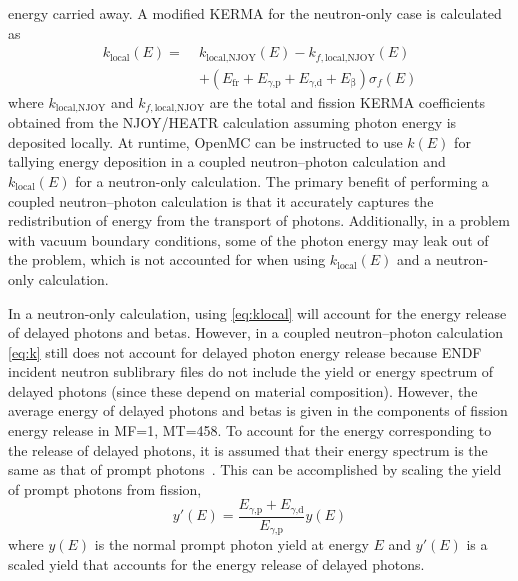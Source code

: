 \documentclass{anstrans}
\newcommand{\efr}{E_\text{fr}}
\newcommand{\egp}{E_\text{$\gamma$,p}}
\newcommand{\egd}{E_\text{$\gamma$,d}}
\newcommand{\eb}{E_\upbeta}
\begin{document}
energy carried away. A modified KERMA for the neutron-only case is calculated as
\begin{equation}
    \label{eq:klocal}
    \begin{split}
    k_\text{local}(E) = \; &k_\text{local,NJOY}(E) - k_{f,\text{local,NJOY}}(E) \\
        &+ \left ( \efr + \egp + \egd + \eb \right )  \sigma_f(E)
    \end{split}
\end{equation}
where $k_\text{local,NJOY}$ and $k_{f,\text{local,NJOY}}$ are the total and
fission KERMA coefficients obtained from the NJOY/HEATR calculation assuming
photon energy is deposited locally. At runtime, OpenMC can be instructed to use
$k(E)$ for tallying energy deposition in a coupled neutron--photon calculation
and $k_\text{local}(E)$ for a neutron-only calculation. The primary benefit of
performing a coupled neutron--photon calculation is that it accurately captures
the redistribution of energy from the transport of photons. Additionally, in a
problem with vacuum boundary conditions, some of the photon energy may leak out
of the problem, which is not accounted for when using $k_\text{local}(E)$ and a
neutron-only calculation.

In a neutron-only calculation, using \cref{eq:klocal} will account for the
energy release of delayed photons and betas. However, in a coupled
neutron--photon calculation \cref{eq:k} still does not account for delayed
photon energy release because ENDF incident neutron sublibrary files do not
include the yield or energy spectrum of delayed photons (since these depend on
material composition). However, the average energy of delayed photons and betas
is given in the components of fission energy release in MF=1, MT=458. To account
for the energy corresponding to the release of delayed photons, it is assumed
that their energy spectrum is the same as that of prompt
photons~\cite{tuominen2019ane}. This can be accomplished by scaling the yield of
prompt photons from fission,
\begin{equation}
    y'(E) = \frac{\egp + \egd}{\egp} y(E)
\end{equation}
where $y(E)$ is the normal prompt photon yield at energy $E$ and $y'(E)$ is a
scaled yield that accounts for the energy release of delayed photons.
\end{document}
